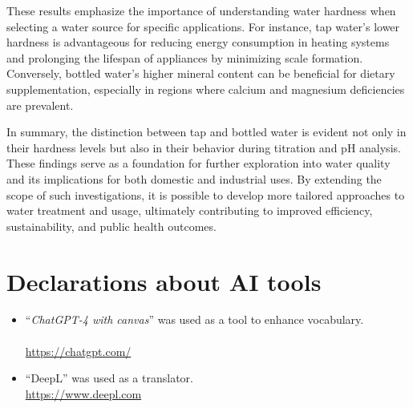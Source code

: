 \documentclass{article}
\newcounter{myequation}
\begin{document}
These results emphasize the importance of understanding water hardness when selecting a water source for specific applications. For instance, tap water's lower hardness is advantageous for reducing energy consumption in heating systems and prolonging the lifespan of appliances by minimizing scale formation. Conversely, bottled water's higher mineral content can be beneficial for dietary supplementation, especially in regions where calcium and magnesium deficiencies are prevalent.

In summary, the distinction between tap and bottled water is evident not only in their hardness levels but also in their behavior during titration and pH analysis. These findings serve as a foundation for further exploration into water quality and its implications for both domestic and industrial uses. By extending the scope of such investigations, it is possible to develop more tailored approaches to water treatment and usage, ultimately contributing to improved efficiency, sustainability, and public health outcomes.

\newpage
\setlength{\bibitemsep}{1.2\baselineskip}

\listoftables

\listoffigures

\listofmyequations

\section*{Declarations about AI tools}
\begin{itemize}
    \item ``\textit{ChatGPT-4 with canvas}'' was used as a tool to enhance vocabulary.\\
        {}\\
        \url{https://chatgpt.com/}
    \item ``DeepL'' was used as a translator.\\
        \url{https://www.deepl.com}
\end{itemize}
\end{document}
